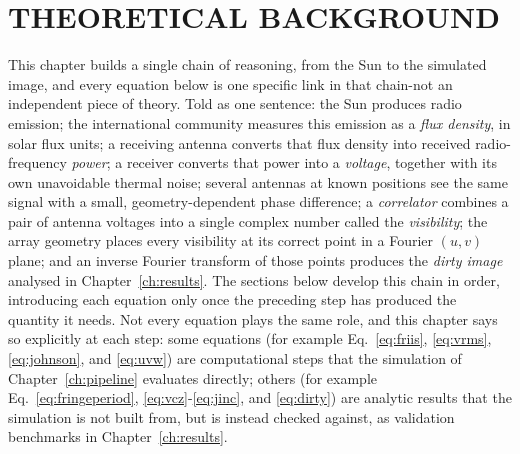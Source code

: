 \chapter{THEORETICAL BACKGROUND}
\label{ch:theory}

This chapter builds a single chain of reasoning, from the Sun to the
simulated image, and every equation below is one specific link in that
chain-not an independent piece of theory. Told as one sentence: the Sun
produces radio emission; the international community measures this emission
as a \emph{flux density}, in solar flux units; a receiving antenna converts
that flux density into received radio-frequency \emph{power}; a receiver
converts that power into a \emph{voltage}, together with its own unavoidable
thermal noise; several antennas at known positions see the same signal with a
small, geometry-dependent phase difference; a \emph{correlator} combines a
pair of antenna voltages into a single complex number called the
\emph{visibility}; the array geometry places every visibility at its correct
point in a Fourier $(u,v)$ plane; and an inverse Fourier transform of those
points produces the \emph{dirty image} analysed in Chapter~\ref{ch:results}.
The sections below develop this chain in order, introducing each equation
only once the preceding step has produced the quantity it needs. Not every
equation plays the same role, and this chapter says so explicitly at each
step: some equations (for example Eq.~\eqref{eq:friis}, \eqref{eq:vrms},
\eqref{eq:johnson}, and \eqref{eq:uvw}) are computational steps that the
simulation of Chapter~\ref{ch:pipeline} evaluates directly; others (for
example Eq.~\eqref{eq:fringeperiod}, \eqref{eq:vcz}-\eqref{eq:jinc}, and
\eqref{eq:dirty}) are analytic results that the simulation is not built from,
but is instead checked against, as validation benchmarks in
Chapter~\ref{ch:results}.

